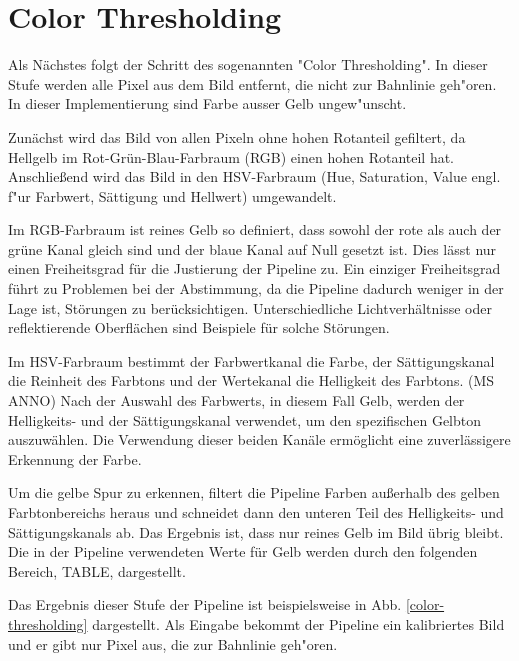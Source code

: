 \documentclass[arbeit=studie,oneside,BCOR=12mm]{ArbeitRST}
\begin{document}
\section{\glqq Color Thresholding\grqq}

Als Nächstes folgt der Schritt des sogenannten "Color Thresholding". In dieser
Stufe werden alle Pixel aus dem Bild entfernt, die nicht zur Bahnlinie geh"oren.
In dieser Implementierung sind Farbe ausser Gelb ungew"unscht.

Zunächst wird das Bild von allen Pixeln ohne hohen Rotanteil gefiltert, da
Hellgelb im Rot-Grün-Blau-Farbraum (RGB) einen hohen Rotanteil hat.
Anschließend wird das Bild in den HSV-Farbraum (Hue, Saturation, Value engl. f"ur Farbwert, Sättigung und
Hellwert) umgewandelt. 

Im RGB-Farbraum ist reines Gelb so definiert, dass sowohl der rote als auch der
grüne Kanal gleich sind und der blaue Kanal auf Null gesetzt ist. Dies lässt
nur einen Freiheitsgrad für die Justierung der Pipeline zu.  Ein einziger
Freiheitsgrad führt zu Problemen bei der Abstimmung, da die Pipeline dadurch
weniger in der Lage ist, Störungen zu berücksichtigen. Unterschiedliche
Lichtverhältnisse oder reflektierende Oberflächen sind Beispiele für solche
Störungen.

Im HSV-Farbraum bestimmt der Farbwertkanal die Farbe, der Sättigungskanal die
Reinheit des Farbtons und der Wertekanal die Helligkeit des Farbtons. (MS ANNO)
Nach der Auswahl des Farbwerts, in diesem Fall Gelb, werden der Helligkeits-
und der Sättigungskanal verwendet, um den spezifischen Gelbton auszuwählen. Die
Verwendung dieser beiden Kanäle ermöglicht eine zuverlässigere Erkennung der
Farbe.

Um die gelbe Spur zu erkennen, filtert die Pipeline Farben außerhalb des gelben
Farbtonbereichs heraus und schneidet dann den unteren Teil des Helligkeits- und
Sättigungskanals ab. Das Ergebnis ist, dass nur reines Gelb im Bild übrig
bleibt. Die in der Pipeline verwendeten Werte für Gelb werden durch den
folgenden Bereich, TABLE, dargestellt.

Das Ergebnis dieser Stufe der Pipeline ist beispielsweise in Abb. \ref{color-thresholding}
dargestellt. Als Eingabe bekommt der Pipeline ein kalibriertes Bild und er gibt nur Pixel aus, die 
zur Bahnlinie geh"oren. \\
\end{document}
